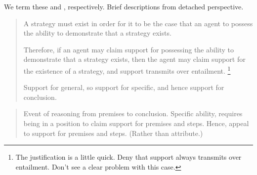 \begin{note}[\WR{} and \AR{}]
  We term these \AR{} and \WR{}, respectively.
  Brief descriptions from detached perspective.

  \begin{description}[left=\parindent]
  \item[\(\cdot\)\hspace{1em}\AR{}]\label{A:s}\mbox{}
    \begin{quote}
      A strategy must exist in order for it to be the case that an agent to possess the ability to demonstrate that a strategy exists.

      Therefore, if an agent may claim support for possessing the ability to demonstrate that a strategy exists, then the agent may claim support for the existence of a strategy, and support transmits over entailment.\nolinebreak
      \footnote{
        The justification is a little quick.
        Deny that support always transmits over entailment.
        Don't see a clear problem with this case.
      }

      Support for general, so support for specific, and hence support for conclusion.
    \end{quote}
  \item[\(\cdot\)\hspace{1em}\WR{}]\label{W:s}\mbox{}
    \begin{quote}
      Event of reasoning from premises to conclusion.
      Specific ability, requires being in a position to claim support for premises and steps.
      Hence, appeal to support for premises and steps.
      (Rather than attribute.)
    \end{quote}
  \end{description}
\end{note}

